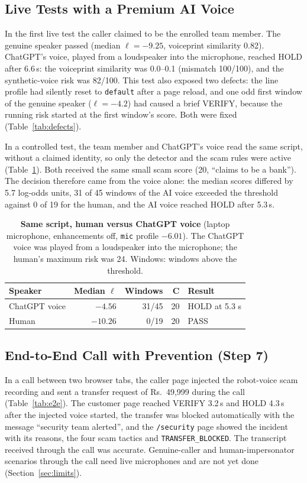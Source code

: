 \documentclass[10pt,a4paper,twocolumn]{article}
\newcommand{\llr}{\ell}
\begin{document}
\subsection{Live Tests with a Premium AI Voice}
In the first live test the caller claimed to be the enrolled team member. The genuine speaker passed (median $\llr=-9.25$, voiceprint similarity 0.82). ChatGPT's voice, played from a loudspeaker into the microphone, reached HOLD after 6.6\,s: the voiceprint similarity was 0.0--0.1 (mismatch 100/100), and the synthetic-voice risk was 82/100. This test also exposed two defects: the line profile had silently reset to \texttt{default} after a page reload, and one odd first window of the genuine speaker ($\llr=-4.2$) had caused a brief VERIFY, because the running risk started at the first window's score. Both were fixed (Table~\ref{tab:defects}).

In a controlled test, the team member and ChatGPT's voice read the same script, without a claimed identity, so only the detector and the scam rules were active (Table~\ref{tab:samescript}). Both received the same small scam score (20, ``claims to be a bank''). The decision therefore came from the voice alone: the median scores differed by 5.7 log-odds units, 31 of 45 windows of the AI voice exceeded the threshold against 0 of 19 for the human, and the AI voice reached HOLD after 5.3\,s.

\begin{table}[t]
\centering\footnotesize
\caption{\textbf{Same script, human versus ChatGPT voice} (laptop microphone, enhancements off, \texttt{mic} profile $-6.01$). The ChatGPT voice was played from a loudspeaker into the microphone; the human's maximum risk was 24. Windows: windows above the threshold.}
\label{tab:samescript}
\setlength{\tabcolsep}{4pt}
\begin{tabular}{@{}lrrrl@{}}
\toprule
\textbf{Speaker} & \textbf{Median $\llr$} & \textbf{Windows} & \textbf{C} & \textbf{Result}\\
\midrule
ChatGPT voice & $-4.56$ & 31/45 & 20 & HOLD at 5.3 s\\
Human & $-10.26$ & 0/19 & 20 & PASS\\
\bottomrule
\end{tabular}
\end{table}

\subsection{End-to-End Call with Prevention (Step 7)}
In a call between two browser tabs, the caller page injected the robot-voice scam recording and sent a transfer request of Rs.~49,999 during the call (Table~\ref{tab:e2e}). The customer page reached VERIFY 3.2\,s and HOLD 4.3\,s after the injected voice started, the transfer was blocked automatically with the message ``security team alerted'', and the \texttt{/security} page showed the incident with its reasons, the four scam tactics and \texttt{TRANSFER\_BLOCKED}. The transcript received through the call was accurate. Genuine-caller and human-impersonator scenarios through the call need live microphones and are not yet done (Section~\ref{sec:limits}).
\end{document}
